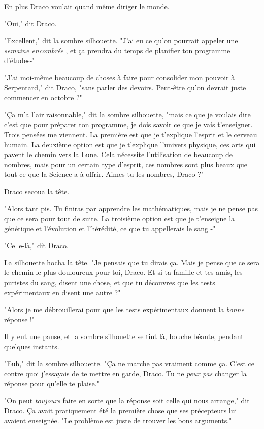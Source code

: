 En plus Draco voulait quand même diriger le monde.

"Oui," dit Draco.

"Excellent," dit la sombre silhouette. "J'ai eu ce qu'on pourrait appeler une \emph{semaine encombrée} , et ça prendra du temps de planifier ton programme d'études-"

"J'ai moi-même beaucoup de choses à faire pour consolider mon pouvoir à Serpentard," dit Draco, "sans parler des devoirs. Peut-être qu'on devrait juste commencer en octobre ?"

"Ça m'a l'air raisonnable," dit la sombre silhouette, "mais ce que je voulais dire c'est que pour préparer ton programme, je dois savoir ce que je vais t'enseigner. Trois pensées me viennent. La première est que je t'explique l'esprit et le cerveau humain. La deuxième option est que je t'explique l'univers physique, ces arts qui pavent le chemin vers la Lune. Cela nécessite l'utilisation de beaucoup de nombres, mais pour un certain type d'esprit, ces nombres sont plus beaux que tout ce que la Science a à offrir. Aimes-tu les nombres, Draco ?"

Draco secoua la tête.

"Alors tant pis. Tu finiras par apprendre les mathématiques, mais je ne pense pas que ce sera pour tout de suite. La troisième option est que je t'enseigne la génétique et l'évolution et l'hérédité, ce que tu appellerais le sang -"

"Celle-là," dit Draco.

La silhouette hocha la tête. "Je pensais que tu dirais ça. Mais je pense que ce sera le chemin le plus douloureux pour toi, Draco. Et si ta famille et tes amis, les puristes du sang, disent une chose, et que tu découvres que les tests expérimentaux en disent une autre ?"

"Alors je me débrouillerai pour que les tests expérimentaux donnent la \emph{bonne}  réponse !"

Il y eut une pause, et la sombre silhouette se tint là, bouche béante, pendant quelques instants.

"Euh," dit la sombre silhouette. "Ça ne marche pas vraiment comme ça. C'est ce contre quoi j'essayais de te mettre en garde, Draco. Tu ne \emph{peux pas}  changer la réponse pour qu'elle te plaise."

"On peut \emph{toujours}  faire en sorte que la réponse soit celle qui nous arrange," dit Draco. Ça avait pratiquement été la première chose que ses précepteurs lui avaient enseignée. "Le problème est juste de trouver les bons arguments."

